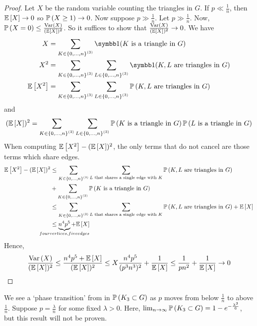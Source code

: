 \begin{proof}
	Let \( X \) be the random variable counting the triangles in \( G \).
	If \( p \ll \frac{1}{n} \), then \( \mathbb{E}\left[{X}\right] \to 0 \) so \( \mathbb{P}\left({X \geq 1}\right) \to 0 \).
	Now suppose \( p \gg \frac{1}{n} \).
	Let \( p \gg \frac{1}{n} \).
	Now, \( \mathbb{P}\left({X = 0}\right) \leq \frac{\operatorname{Var}\left({X}\right)}{(\mathbb{E}\left[{X}\right])^2} \).
	So it suffices to show that \( \frac{\operatorname{Var}\left({X}\right)}{(\mathbb{E}\left[{X}\right])^2} \to 0 \).
	We have
	\begin{align*}
		X &= \sum_{K \in \qty{0, \dots, n}^{(3)}} \symbb 1(K \text{ is a triangle in } G) \\
		X^2 &= \sum_{K \in \qty{0, \dots, n}^{(3)}} \sum_{L \in \qty{0, \dots, n}^{(3)}} \symbb 1(K, L \text{ are triangles in } G) \\
		\expect{X^2} &= \sum_{K \in \qty{0, \dots, n}^{(3)}} \sum_{L \in \qty{0, \dots, n}^{(3)}} \prob{K, L \text{ are triangles in } G}
	\end{align*}
	and
	\[ (\mathbb{E}\left[{X}\right])^2 = \sum_{K \in \qty{0, \dots, n}^{(3)}} \sum_{L \in \qty{0, \dots, n}^{(3)}} \mathbb{P}\left({K \text{ is a triangle in } G}\right) \mathbb{P}\left({L \text{ is a triangle in } G}\right) \]
	When computing \( \mathbb{E}\left[{X^2}\right] - (\mathbb{E}\left[{X}\right])^2 \), the only terms that do not cancel are those terms which share edges.
	\begin{align*}
		\expect{X^2} - (\expect{X})^2 &\leq \sum_{K \in \qty{0, \dots, n}^{(3)}} \sum_{L \text{ that shares a single edge with } K} \prob{K, L \text{ are triangles in } G} \\
		&+ \sum_{K \in \qty{0, \dots, n}^{(3)}} \prob{K \text{ is a triangle in } G} \\
		&\leq \sum_{K \in \qty{0, \dots, n}^{(3)}} \sum_{L \text{ that shares a single edge with } K} \prob{K, L \text{ are triangles in } G} + \expect{X} \\
		&\leq \underbrace{n^4 p^5}_{\mathclap{four vertices, five edges}} + \expect{X}
	\end{align*}
	Hence,
	\[ \frac{\operatorname{Var}\left({X}\right)}{(\mathbb{E}\left[{X}\right])^2} \leq \frac{n^4 p^5 + \mathbb{E}\left[{X}\right]}{(\mathbb{E}\left[{X}\right])^2} \leq X \frac{n^4 p^5}{(p^3 n^3)^2} + \frac{1}{\mathbb{E}\left[{X}\right]} \leq \frac{1}{pn^2} + \frac{1}{\mathbb{E}\left[{X}\right]} \to 0 \]
\end{proof}
\begin{remark}
	We see a `phase transition' from in \( \mathbb{P}\left({K_3 \subset G}\right) \) as \( p \) moves from below \( \frac{1}{n} \) to above \( \frac{1}{n} \).
	Suppose \( p = \frac{\lambda}{n} \) for some fixed \( \lambda > 0 \).
	Here, \( \lim_{n \to \infty} \mathbb{P}\left({K_3 \subset G}\right) = 1 - e^{-\frac{\lambda^3}{6}} \), but this result will not be proven.
\end{remark}

